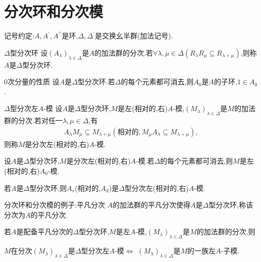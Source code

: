 \section{分次环和分次模}

记号约定:$A,A^{\prime},A^{\prime\prime}$是环,$\Delta,\Delta^{\prime}$是交换幺半群(加法记号).

\begin{definition}{$\Delta$型分次环}{}
	设$\left(A_{\lambda}\right)_{\lambda\in\Delta}$是$A$的加法群的分次.若$\forall\lambda,\mu\in\Delta\left(R_{\lambda}R_{\mu}\subseteq R_{\lambda+\mu}\right)$,则称$A$是$\Delta$型分次环.
\end{definition}

\begin{proposition}{$0$次分量的性质}{}
	设$A$是$\Delta$型分次环.若$\Delta$的每个元素都可消去,则$A_{0}$是$A$的子环,$1\in A_{0}$.
\end{proposition}

\begin{definition}{$\Delta$型分次左$A$-模}{}
	设$A$是$\Delta$型分次环,$M$是左(相对的,右)$A$-模,$\left(M_{\lambda}\right)_{\lambda\in\Delta}$是$M$的加法群的分次.若对任一$\lambda,\mu\in\Delta$,有
	\begin{align*}
		A_{\lambda}M_{\mu}\subseteq M_{\lambda+\mu}\left(\text{相对的},M_{\mu}A_{\lambda}\subseteq M_{\lambda+\mu}\right),
	\end{align*}
	则称$M$是分次左(相对的,右)$A$-模.
\end{definition}

\begin{corollary}{}{}
	设$A$是$\Delta$型分次环,$M$是分次左(相对的,右)$A$-模.若$\Delta$的每个元素都可消去,则$M$是左(相对的,右)$A_{0}$-模.
\end{corollary}

\begin{corollary}{}{}
	若$A$是$\Delta$型分次环,则$A_{s}$(相对的,$A_{d}$)是$\Delta$型分次左(相对的,右)$A$-模.
\end{corollary}

\begin{example}{分次环和分次模的例子:平凡分次}{}
	$A$的加法群的平凡分次使得$A$是$\Delta$型分次环,称该分次为$A$的平凡分次.
	
	若$A$是配备平凡分次的$\Delta$型分次环,$M$是左$A$-模,$\left(M_{\lambda}\right)_{\lambda\in\Delta}$是$M$的加法群的分次,则
	\begin{center}
		$M$在分次$\left(M_{\lambda}\right)_{\lambda\in\Delta}$是$\Delta$型分次左$A$-模$\iff$ $\left(M_{\lambda}\right)_{\lambda\in\Delta}$是$M$的一族左$A$-子模.
	\end{center}
\end{example}

